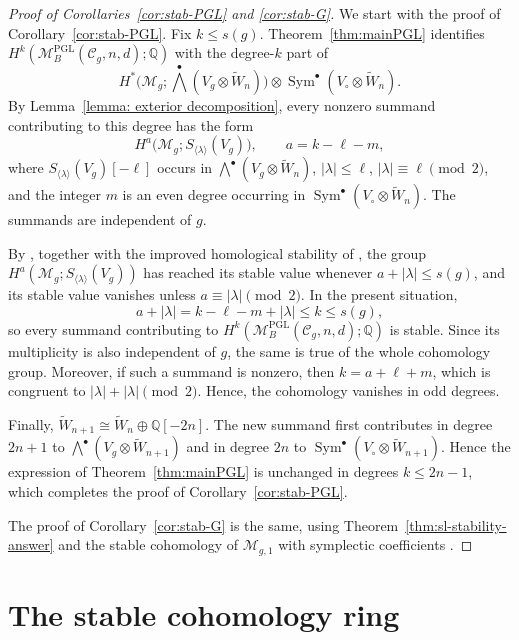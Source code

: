 \documentclass[11pt,reqno]{amsart}
\theoremstyle{plain} %
\theoremstyle{definition}
\newcommand{\QQ}{\mathbb{Q}}
\newcommand{\M}{\mathcal{M}}
\newcommand{\C}{\mathcal{C}}
\DeclareMathOperator{\PGL}{PGL}
\DeclareMathOperator{\Sym}{Sym}
\newcommand{\tW}{\widetilde{W}}
\begin{document}
\begin{proof}[Proof of Corollaries~\ref{cor:stab-PGL} and \ref{cor:stab-G}]
We start with the proof of Corollary~\ref{cor:stab-PGL}. Fix $k\leq s(g)$. Theorem~\ref{thm:mainPGL} identifies $H^k(\M_B^{\PGL}(\C_g,n,d);\QQ)$ with the degree-$k$ part of
\[
H^*\big(\M_g;\textstyle{\bigwedge^\bullet}(V_g\otimes\tW_n)\big)\otimes\Sym^\bullet(V_\circ\otimes\tW_n).
\]
By Lemma~\ref{lemma: exterior decomposition}, every nonzero summand contributing to this degree has the form
\[
H^a\big(\M_g;S_{\langle\lambda\rangle}(V_g)\big),
\qquad
a=k-\ell-m,
\]
where $S_{\langle\lambda\rangle}(V_g)[-\ell]$ occurs in $\bigwedge^\bullet(V_g\otimes\tW_n)$, $|\lambda|\leq \ell$, $|\lambda|\equiv \ell\pmod 2$, and the integer $m$ is an even degree occurring in $\Sym^\bullet(V_\circ\otimes\tW_n)$. The  summands are independent of $g$. 

By \cite[Theorem~1.1]{looijenga-symplectic-coeffs}, together with the improved homological stability of \cite{boldsen,RW-resolutions}, the group $H^a(\M_g;S_{\langle\lambda\rangle}(V_g))$ has reached its stable value whenever $a+|\lambda|\leq s(g)$, and its stable value vanishes unless $a\equiv|\lambda|\pmod 2$. In the present situation,
\[
a+|\lambda|
=
k-\ell-m+|\lambda|
\leq k
\leq s(g),
\]
so every summand contributing to $H^k(\M_B^{\PGL}(\C_g,n,d);\QQ)$ is stable. Since its multiplicity is also independent of $g$, the same is true of the whole cohomology group. Moreover, if such a summand is nonzero, then $k=a+\ell+m$, which is congruent to $|\lambda| + |\lambda| \pmod 2$. Hence, the cohomology vanishes in odd degrees.

Finally, $\tW_{n+1}\cong\tW_n\oplus\QQ[-2n]$. The new summand first contributes in degree $2n+1$ to $\bigwedge^\bullet(V_g\otimes\tW_{n+1})$ and in degree $2n$ to $\Sym^\bullet(V_\circ\otimes\tW_{n+1})$. Hence the expression of Theorem~\ref{thm:mainPGL} is unchanged in degrees $k\leq2n-1$, which completes the proof of Corollary~\ref{cor:stab-PGL}.

The proof of Corollary~\ref{cor:stab-G} is the same, using Theorem~\ref{thm:sl-stability-answer} and the stable cohomology of $\M_{g,1}$ with symplectic coefficients \cite{Kawazumi,Randal-Williams}.
\end{proof}



\section{The stable cohomology ring} \label{sec: ring}
\end{document}
